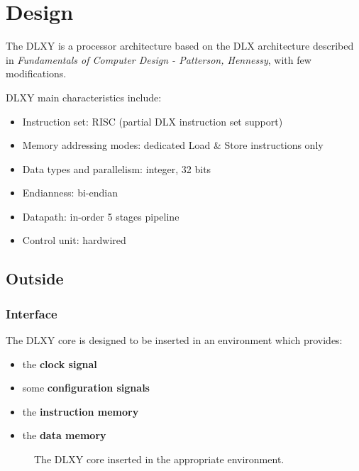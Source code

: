 \chapter{Design}
\label{chap:design}

The DLXY is a processor architecture based on the DLX architecture described
in \textit{Fundamentals of Computer Design - Patterson, Hennessy}, with few
modifications.

\bigskip
DLXY main characteristics include:
\begin{itemize}
	\item Instruction set: RISC (partial DLX instruction set support)
	\item Memory addressing modes: dedicated Load \& Store instructions only
	\item Data types and parallelism: integer, 32 bits
	\item Endianness: bi-endian
	\item Datapath: in-order 5 stages pipeline
	\item Control unit: hardwired
\end{itemize}

\section{Outside}

\subsection{Interface}
The DLXY core is designed to be inserted in an environment which provides:
\begin{itemize}
	\item the \textbf{clock signal}
	\item some \textbf{configuration signals}
	\item the \textbf{instruction memory}
	\item the \textbf{data memory}
\end{itemize}

\begin{figure}[H]
	\centering
	\caption{The DLXY core inserted in the appropriate environment.}
	\label{fig:env_top}
\end{figure}

